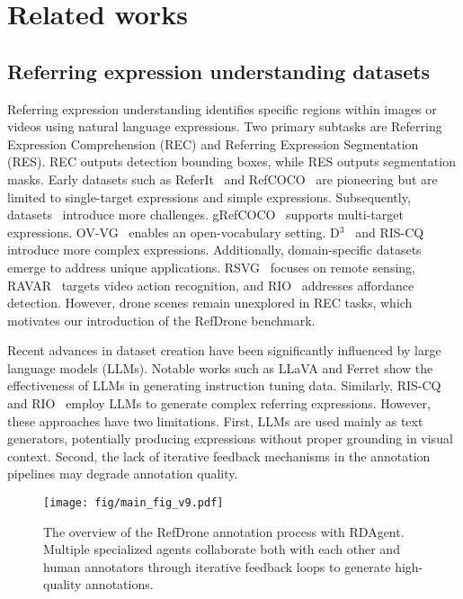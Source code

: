\section{Related works}


\subsection{Referring expression understanding datasets}
Referring expression understanding identifies specific regions within images or videos using natural language expressions. Two primary subtasks are Referring Expression Comprehension (REC) and Referring Expression Segmentation (RES). REC outputs detection bounding boxes, while RES outputs segmentation masks. Early datasets such as ReferIt~\cite{kazemzadeh2014referitgame} and RefCOCO~\cite{refcoco} are pioneering but are limited to single-target expressions and simple expressions. Subsequently, datasets~\cite{grefcoco, ovvg, riscq, xie2024described} introduce more challenges. gRefCOCO~\cite{grefcoco} supports multi-target expressions. OV-VG~\cite{ovvg} enables an open-vocabulary setting. D$^3$~\cite{xie2024described} and RIS-CQ~\cite{riscq} introduce more complex expressions. Additionally, domain-specific datasets~\cite{zhan2023rsvg,peng2024ravar,qu2024rio} emerge to address unique applications. RSVG~\cite{zhan2023rsvg} focuses on remote sensing, RAVAR~\cite{peng2024ravar} targets video action recognition, and RIO~\cite{qu2024rio} addresses affordance detection. However, drone scenes remain unexplored in REC tasks, which motivates our introduction of the RefDrone benchmark. \par

Recent advances in dataset creation have been significantly influenced by large language models (LLMs). Notable works such as LLaVA \cite{llava} and Ferret \cite{you2023ferret} show the effectiveness of LLMs in generating instruction tuning data. Similarly, RIS-CQ~\cite{riscq} and RIO~\cite{qu2024rio} employ LLMs to generate complex referring expressions. However, these approaches have two limitations. First, LLMs are used mainly as text generators, potentially producing expressions without proper grounding in visual context. Second, the lack of iterative feedback mechanisms in the annotation pipelines may degrade annotation quality.



 \begin{figure*}[t]
\centering
\texttt{[image: fig/main\_fig\_v9.pdf]}
\caption{The overview of the RefDrone annotation process with RDAgent. Multiple specialized agents collaborate both with each other and human annotators through iterative feedback loops to generate high-quality annotations.}

\label{fig:agent}
\end{figure*}

